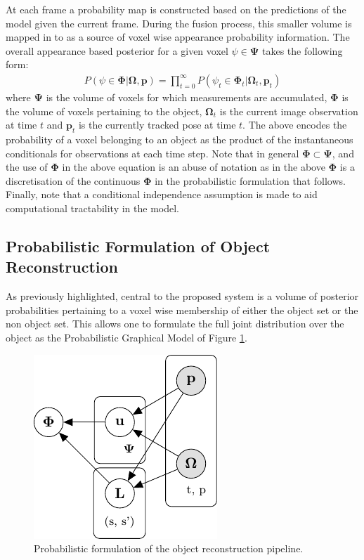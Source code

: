 At each frame a probability map is constructed based on the predictions of the model given the current frame. During the fusion process, this 
smaller volume is mapped in to as a source of voxel wise appearance probability information. The overall appearance based posterior for a given voxel 
$\psi \in \bm{\Psi}$ takes the following form:
\begin{equation}
\begin{split}
P(\psi \in \bm{\Phi} | \bm{\Omega}, \bm{p}) = \prod_{t=0}^{\infty} P(\psi_{t} \in \bm{\Phi}_{t} | \bm{\Omega}_{t}, \bm{p}_{t})
\end{split}
\end{equation}
where $\bm{\Psi}$ is the volume of voxels for which measurements are accumulated, $\bm{\Phi}$ 
is the volume of voxels pertaining to the object, $\bm{\Omega}_{t}$ is the current image observation at time $t$ and $\bm{p}_{t}$ is the 
currently tracked pose at time $t$.
The above encodes the probability of a voxel belonging to an object as the product of the instantaneous conditionals for observations at each time step. 
Note that in general $\bm{\Phi} \subset \bm{\Psi}$, and the use of $\bm{\Phi}$ in the above equation is an abuse of notation as in the above 
$\bm{\Phi}$ is a discretisation of the continuous $\bm{\Phi}$ in the probabilistic formulation that follows. Finally, note that a conditional 
independence assumption is made to aid computational tractability in the model.

\subsection{Probabilistic Formulation of Object Reconstruction}
As previously highlighted, central to the proposed system is a volume of posterior probabilities pertaining to a voxel wise membership of either the 
object set or the non object set. This allows one to formulate the full joint distribution over the object as the Probabilistic 
Graphical Model of Figure \ref{pgm1}.
\begin{figure}[h]
	\centering
	\includegraphics{graphical_models/pgm1.pdf}
	\caption{Probabilistic formulation of the object reconstruction pipeline.}
	\label{pgm1}
\end{figure}

